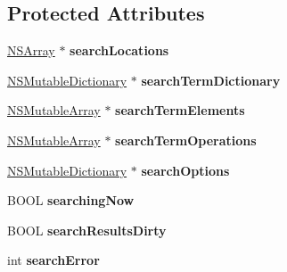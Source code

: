 \subsection*{Protected Attributes}
\begin{DoxyCompactItemize}
\item 
\hypertarget{interface_p_a_d_search_request_a7e7234c8abc04a3366207123c6b8f0d4}{
\hyperlink{class_n_s_array}{NSArray} $\ast$ {\bfseries searchLocations}}
\label{interface_p_a_d_search_request_a7e7234c8abc04a3366207123c6b8f0d4}

\item 
\hypertarget{interface_p_a_d_search_request_a17f3880cebae9f6820320ab8e8de36a9}{
\hyperlink{class_n_s_mutable_dictionary}{NSMutableDictionary} $\ast$ {\bfseries searchTermDictionary}}
\label{interface_p_a_d_search_request_a17f3880cebae9f6820320ab8e8de36a9}

\item 
\hypertarget{interface_p_a_d_search_request_a34b8516ef862a69f26189901e92a31aa}{
\hyperlink{class_n_s_mutable_array}{NSMutableArray} $\ast$ {\bfseries searchTermElements}}
\label{interface_p_a_d_search_request_a34b8516ef862a69f26189901e92a31aa}

\item 
\hypertarget{interface_p_a_d_search_request_a8d1f7b26c922237b444abeac0d35cd1b}{
\hyperlink{class_n_s_mutable_array}{NSMutableArray} $\ast$ {\bfseries searchTermOperations}}
\label{interface_p_a_d_search_request_a8d1f7b26c922237b444abeac0d35cd1b}

\item 
\hypertarget{interface_p_a_d_search_request_a520623d14d24885cd2c1e419db144b73}{
\hyperlink{class_n_s_mutable_dictionary}{NSMutableDictionary} $\ast$ {\bfseries searchOptions}}
\label{interface_p_a_d_search_request_a520623d14d24885cd2c1e419db144b73}

\item 
\hypertarget{interface_p_a_d_search_request_a4a3e08c60a5fedc4fd9cd00de0b67597}{
BOOL {\bfseries searchingNow}}
\label{interface_p_a_d_search_request_a4a3e08c60a5fedc4fd9cd00de0b67597}

\item 
\hypertarget{interface_p_a_d_search_request_a9b9d2e7699cb35a4055295f0c6602b5e}{
BOOL {\bfseries searchResultsDirty}}
\label{interface_p_a_d_search_request_a9b9d2e7699cb35a4055295f0c6602b5e}

\item 
\hypertarget{interface_p_a_d_search_request_a512b3a20b00a40487d5afb148560f9be}{
int {\bfseries searchError}}
\label{interface_p_a_d_search_request_a512b3a20b00a40487d5afb148560f9be}


\end{DoxyCompactItemize}
